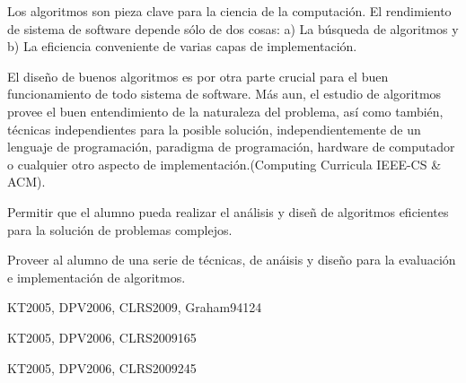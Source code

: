 \begin{syllabus}


\begin{justification}
Los algoritmos son pieza clave para la ciencia de la computación. 
El rendimiento de sistema de software
depende sólo de dos cosas: a) La búsqueda de  algoritmos y b) La
eficiencia conveniente de varias capas de implementación.

El diseño de buenos algoritmos es por otra parte crucial para el
buen funcionamiento de todo sistema de software. Más aun, el
estudio  de algoritmos provee el buen entendimiento de la
naturaleza  del problema, así­ como también, técnicas
independientes para la posible solución, independientemente de un
lenguaje de programación, paradigma de programación, hardware de
computador o cualquier otro aspecto de implementación.(Computing
Curricula IEEE-CS \& ACM).
\end{justification}

\begin{goals}
 \item Permitir que el alumno pueda realizar el análisis y diseñ
de algoritmos eficientes para la solución de problemas complejos.

 \item Proveer al alumno de una serie de técnicas, de anáisis y
diseño para la evaluación e implementación de algoritmos.
\end{goals}

\begin{outcomes}
\end{outcomes}

\begin{unit}{\ALBasicAnalysisDef}{KT2005, DPV2006, CLRS2009, Graham94}{12}{4}
    \ALBasicAnalysisAllTopics
    \ALBasicAnalysisAllObjectives
\end{unit}

\begin{unit}{\ALFundamentalAlgorithmsDef}{KT2005, DPV2006, CLRS2009}{16}{5}
    \ALFundamentalAlgorithmsAllTopics
    \ALFundamentalAlgorithmsAllObjectives
\end{unit}

\begin{unit}{\ALAlgoritmicStrategiesDef}{KT2005, DPV2006, CLRS2009}{24}{5}
   \ALAlgoritmicStrategiesAllTopics
   \ALAlgoritmicStrategiesAllObjectives
\end{unit}


\end{syllabus}
